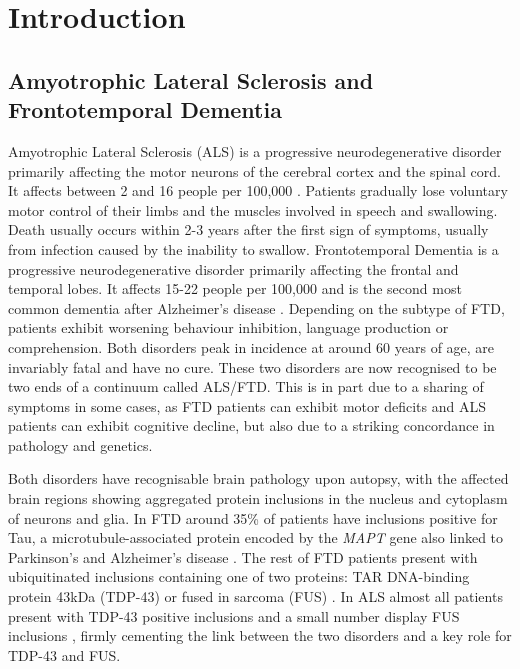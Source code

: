 
\chapter{Introduction}

\section{Amyotrophic Lateral Sclerosis and Frontotemporal Dementia} %

Amyotrophic Lateral Sclerosis (ALS) is a progressive neurodegenerative disorder primarily affecting the motor neurons of the cerebral cortex and the spinal cord. It affects between 2 and 16 people per 100,000 \citep{Logroscino2010}. Patients gradually lose voluntary motor control of their limbs and the muscles involved in speech and swallowing. Death usually occurs within 2-3 years after the first sign of symptoms, usually from infection caused by the inability to swallow. Frontotemporal Dementia is a progressive neurodegenerative disorder primarily affecting the frontal and temporal lobes. It affects 15-22 people per 100,000 and is the second most common dementia after Alzheimer's disease \citep{Onyike2013}. Depending on the subtype of FTD, patients exhibit worsening behaviour inhibition, language production or comprehension. Both disorders peak in incidence at around 60 years of age, are invariably fatal and have no cure. These two disorders are now recognised to be two ends of a continuum called ALS/FTD. This is in part due to a sharing of symptoms in some cases, as FTD patients can exhibit motor deficits and ALS patients can exhibit cognitive decline, but also due to a striking concordance in pathology and genetics.  %

Both disorders have recognisable brain pathology upon autopsy, with the affected brain regions showing aggregated protein inclusions in the nucleus and cytoplasm of neurons and glia. In FTD around 35\% of patients have inclusions positive for Tau, a microtubule-associated protein encoded by the \textit{MAPT} gene also linked to Parkinson's and Alzheimer's disease \citep{Rademakers2004}. The rest of FTD patients present with ubiquitinated inclusions containing one of two proteins: TAR DNA-binding protein 43kDa (TDP-43) \citep{Neumann2006-re} or fused in sarcoma (FUS) \citep{Neumann2009}. In ALS almost all patients present with TDP-43 positive inclusions \citep{Neumann2006-re} and a small number display FUS inclusions \citep{Vance2009-ye}, firmly cementing the link between the two disorders and a key role for TDP-43 and FUS.

